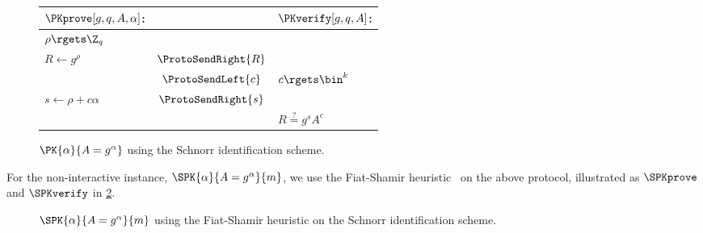 \begin{figure*}
  \centering
  \begin{tabular}{lcl}
    \(\PKprove[g, q, A, \alpha]\):
    &
    & \(\PKverify[g, q, A]\):
    \\
    \toprule

    \(\rho\rgets \Z_q\)
    &
    &
    \\

    \(R\gets g^{\rho}\)
    & \(\ProtoSendRight{R}\)
    &
    \\

    & \(\ProtoSendLeft{c}\)
    & \(c\rgets \bin^k\)
    \\

    \(s\gets \rho + c\alpha\)
    & \(\ProtoSendRight{s}\)
    &
    \\

    &
    & \(R \stackrel{?}{=} g^s A^c\)
    \\
    
    \bottomrule
  \end{tabular}
  \caption{%
    \(\PK{\alpha}{A = g^\alpha}\) using the Schnorr identification scheme.
  }%
  \label{PKalgorithms}
\end{figure*}


For the non-interactive instance, \(\SPK{\alpha}{A = g^\alpha}{m}\), we use the 
Fiat-Shamir heuristic~\cite{FiatShamirHeuristic} on the above protocol, 
illustrated as \(\SPKprove\) and \(\SPKverify\) in \cref{SPKalgorithms}.

\begin{figure*}
  \begin{minipage}[t]{0.48\linewidth}
    \begin{algorithmic}
      \EndFunction{}
    \end{algorithmic}
  \end{minipage}
  \hfill
  \begin{minipage}[t]{0.48\linewidth}
    \begin{algorithmic}
        \Else{}
        \EndIf{}
      \EndFunction{}
    \end{algorithmic}
  \end{minipage}
  \caption{%
    \(\SPK{\alpha}{A = g^\alpha}{m}\) using the Fiat-Shamir heuristic on the 
    Schnorr identification scheme.
  }%
  \label{SPKalgorithms}
\end{figure*}
